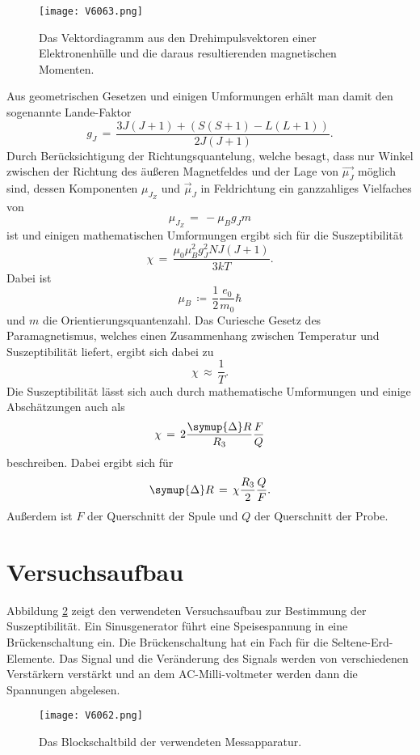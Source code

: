 \documentclass[
  bibliography=totoc,     %
  captions=tableheading,  %
  titlepage=firstiscover, %
]{scrartcl}
\begin{document}
\begin{figure}[H]
  \centering
  \texttt{[image: V6063.png]}
  \caption{Das Vektordiagramm aus den Drehimpulsvektoren einer Elektronenhülle
  und die daraus resultierenden magnetischen Momenten. \cite{anleitung}}
  \label{fig:V6061}
\end{figure}
\noindent
Aus geometrischen Gesetzen und einigen Umformungen erhält man damit den sogenannte Lande-Faktor
\begin{equation}
  g_J\,=\, \frac{3J(J+1)+ (S(S+1)-L(L+1))}{2J(J+1)}.
  \label{eqn:g_j}
\end{equation}
Durch Berücksichtigung der Richtungsquantelung, welche besagt, dass nur Winkel
zwischen der Richtung des äußeren Magnetfeldes und der Lage von $\vec{\mu_J}$
möglich sind, dessen Komponenten $\mu_{J_Z}$ und $\vec{\mu}_J$ in Feldrichtung
ein ganzzahliges Vielfaches von
\begin{equation}
  \mu_{J_Z} \,=\,- \mu_B g_J m
  \label{eqn:mu}
\end{equation}
ist und einigen mathematischen Umformungen ergibt sich für die Suszeptibilität
\begin{equation}
  \chi \,=\, \frac{\mu_0 \mu_B^2 g_J^2 NJ(J+1)}{3kT}.
  \label{eqn:xi}
\end{equation}
Dabei ist
\begin{equation*}
  \mu_B\,\coloneq\,\frac{1}{2} \frac{e_0}{m_0} \hbar
\end{equation*}
und $m$ die Orientierungsquantenzahl.
Das Curiesche Gesetz des Paramagnetismus, welches einen Zusammenhang zwischen
Temperatur und Suszeptibilität liefert, ergibt sich dabei zu
\begin{equation}
  \chi\,\approx\,\frac{1}{T}.
\end{equation}
Die Suszeptibilität lässt sich auch durch mathematische Umformungen und einige
Abschätzungen auch als
\begin{equation}
  \chi\,=\,2\frac{\symup{\Delta}R}{R_3} \frac{F}{Q}
  \label{eqn:xi2}
\end{equation}
beschreiben. Dabei ergibt sich für
\begin{equation*}
  \symup{\Delta}R\,=\,\chi \frac{R_3}{2} \frac{Q}{F}.
\end{equation*}
Außerdem ist $F$ der Querschnitt der Spule und $Q$ der Querschnitt der Probe.

\section{Versuchsaufbau}
\label{sec:aufbau}
Abbildung \ref{fig:V6062} zeigt den verwendeten Versuchsaufbau zur Bestimmung
der Suszeptibilität. Ein Sinusgenerator führt eine Speisespannung in eine
Brückenschaltung ein. Die Brückenschaltung hat ein Fach für die
Seltene-Erd-Elemente. Das Signal und die Veränderung des Signals
werden von verschiedenen Verstärkern verstärkt und an dem AC-Milli-voltmeter
werden dann die Spannungen abgelesen.
\begin{figure}[H]
  \centering
  \texttt{[image: V6062.png]}
  \caption{Das Blockschaltbild der verwendeten Messapparatur. \cite{anleitung}}
  \label{fig:V6062}
\end{figure}
\noindent
\end{document}
